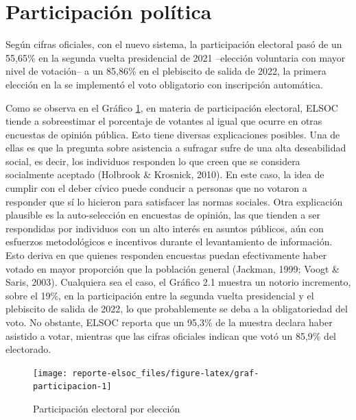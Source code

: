 \documentclass[
  12pt,
]{book}
\begin{document}
\hypertarget{participaciuxf3n-poluxedtica}{%
\section{Participación política}\label{participaciuxf3n-poluxedtica}}

Según cifras oficiales, con el nuevo sistema, la participación electoral pasó de un 55,65\% en la segunda vuelta presidencial de 2021 --elección voluntaria con mayor nivel de votación-- a un 85,86\% en el plebiscito de salida de 2022, la primera elección en la se implementó el voto obligatorio con inscripción automática.

Como se observa en el Gráfico \ref{fig:graf-participacion}, en materia de participación electoral, ELSOC tiende a sobreestimar el porcentaje de votantes al igual que ocurre en otras encuestas de opinión pública. Esto tiene diversas explicaciones posibles. Una de ellas es que la pregunta sobre asistencia a sufragar sufre de una alta deseabilidad social, es decir, los individuos responden lo que creen que se considera socialmente aceptado (Holbrook \& Krosnick, 2010). En este caso, la idea de cumplir con el deber cívico puede conducir a personas que no votaron a responder que sí lo hicieron para satisfacer las normas sociales. Otra explicación plausible es la auto-selección en encuestas de opinión, las que tienden a ser respondidas por individuos con un alto interés en asuntos públicos, aún con esfuerzos metodológicos e incentivos durante el levantamiento de información. Esto deriva en que quienes responden encuestas puedan efectivamente haber votado en mayor proporción que la población general (Jackman, 1999; Voogt \& Saris, 2003). Cualquiera sea el caso, el Gráfico 2.1 muestra un notorio incremento, sobre el 19\%, en la participación entre la segunda vuelta presidencial y el plebiscito de salida de 2022, lo que probablemente se deba a la obligatoriedad del voto. No obstante, ELSOC reporta que un 95,3\% de la muestra declara haber asistido a votar, mientras que las cifras oficiales indican que votó un 85,9\% del electorado.

\begin{figure}

{\centering \texttt{[image: reporte-elsoc\_files/figure-latex/graf-participacion-1]} 

}

\caption{Participación electoral por elección}\label{fig:graf-participacion}
\end{figure}
\end{document}
